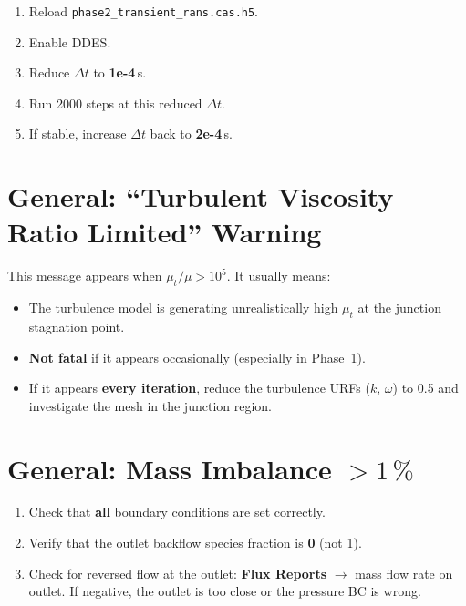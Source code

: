 \documentclass[12pt,a4paper]{report}
\begin{document}
\begin{enumerate}
  \item Reload \texttt{phase2\_transient\_rans.cas.h5}.
  \item Enable DDES.
  \item Reduce $\Delta t$ to \textbf{1e-4}\,s.
  \item Run 2000 steps at this reduced $\Delta t$.
  \item If stable, increase $\Delta t$ back to \textbf{2e-4}\,s.
\end{enumerate}


\section{General: ``Turbulent Viscosity Ratio Limited'' Warning}

This message appears when $\mu_t / \mu > 10^5$.  It usually means:

\begin{itemize}
  \item The turbulence model is generating unrealistically high
        $\mu_t$ at the junction stagnation point.
  \item \textbf{Not fatal} if it appears occasionally (especially in
        Phase~1).
  \item If it appears \textbf{every iteration}, reduce the turbulence
        URFs ($k$, $\omega$) to 0.5 and investigate the mesh in the
        junction region.
\end{itemize}


\section{General: Mass Imbalance $> 1\,\%$}

\begin{enumerate}
  \item Check that \textbf{all} boundary conditions are set correctly.
  \item Verify that the outlet backflow species fraction is \textbf{0}
        (not 1).
  \item Check for reversed flow at the outlet: \textbf{Flux Reports}
        $\rightarrow$ mass flow rate on outlet.  If negative, the
        outlet is too close or the pressure BC is wrong.
\end{enumerate}


\end{document}
